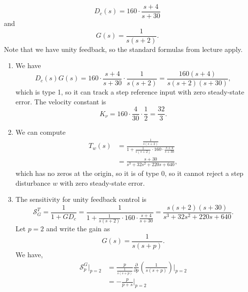 \documentclass{article}
\numberwithin{equation}{section}
\begin{document}
\begin{enumerate}[label=\textbf{2.\arabic*}]
    \begin{equation}
        D_c(s) = 160 \cdot \frac{s+4}{s+30}
    \end{equation}
    and 
    \begin{equation}
        G(s) = \frac{1}{s(s+2)}.
    \end{equation}
    Note that we have unity feedback, so the standard formulas from lecture apply.
    \begin{enumerate}[label=(\alph*)]
        \item We have
        \begin{equation}
            D_c(s)G(s) = 160 \cdot \frac{s+4}{s+30} \cdot \frac{1}{s(s+2)} = \frac{160 (s + 4)}{s (s + 2) (s + 30)},
        \end{equation}
        which is type 1, so it can track a step reference input with zero steady-state error. The velocity constant is 
        \begin{equation}
            K_\nu = 160 \cdot \frac{4}{30} \cdot \frac{1}{2} = \frac{32}{3}.
        \end{equation}
        \item We can compute 
        \begin{align}
            T_w(s) &= \frac{\frac{1}{s(s+2)}}{1+\frac{1}{s(s+2)} \cdot 160 \cdot \frac{s+4}{s+30}} \\ 
            &= \frac{s + 30}{s^{3} + 32 s^{2} + 220 s + 640},
        \end{align}
        which has no zeros at the origin, so it is of type 0, so it cannot reject a step disturbance $w$ with zero steady-state error.
        \item The sensitivity for unity feedback control is 
        \begin{equation}
            \mathcal{S}^T_{G} = \frac{1}{1+GD_c} = \frac{1}{1+\frac{1}{s(s+2)} \cdot 160 \cdot \frac{s+4}{s+30}} = \frac{s (s + 2) (s + 30)}{s^{3} + 32 s^{2} + 220 s + 640}.
        \end{equation}
        Let $p=2$ and write the gain as 
        \begin{equation}
            G(s) = \frac{1}{s(s+p)}.
        \end{equation}
        We have,
        \begin{align}
            \mathcal{S}^G_p\bigg|_{p=2} &= \frac{p}{\frac{1}{s(s+p)}} \frac{\partial}{\partial p}\left(\frac{1}{s(s+p)}\right)\bigg|_{p=2} \\ 
            &= - \frac{p}{p + s}\bigg|_{p=2} \\ 

\end{align}
\end{enumerate}
\end{enumerate}
\end{document}
